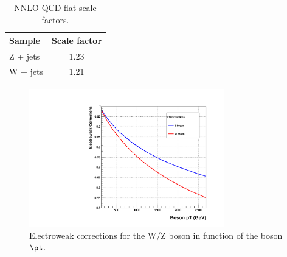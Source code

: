 \begin{table}[!ht]
\begin{center}
\caption{NNLO QCD flat scale factors.}
\label{tab:scalefactors}
\begin{tabular}{lc} \hline
Sample & Scale factor \\ \hline
Z + jets &  1.23   \\
W + jets  &  1.21\\ \hline
\end{tabular}
\end{center}
\end{table}

\begin{figure}[!ht]
\begin{center}
  \includegraphics[width=240pt]{figures/Samples/EWcorrections.pdf}
\end{center}


\caption{Electroweak corrections for the W/Z boson in function of the boson $\pt$.}
\label{fig:EW}
\end{figure}

